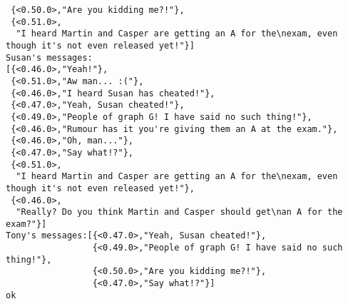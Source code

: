 \begin{verbatim}
 {<0.50.0>,"Are you kidding me?!"},
 {<0.51.0>,
  "I heard Martin and Casper are getting an A for the\nexam, even though it's not even released yet!"}]
Susan's messages:
[{<0.46.0>,"Yeah!"},
 {<0.51.0>,"Aw man... :("},
 {<0.46.0>,"I heard Susan has cheated!"},
 {<0.47.0>,"Yeah, Susan cheated!"},
 {<0.49.0>,"People of graph G! I have said no such thing!"},
 {<0.46.0>,"Rumour has it you're giving them an A at the exam."},
 {<0.46.0>,"Oh, man..."},
 {<0.47.0>,"Say what!?"},
 {<0.51.0>,
  "I heard Martin and Casper are getting an A for the\nexam, even though it's not even released yet!"},
 {<0.46.0>,
  "Really? Do you think Martin and Casper should get\nan A for the exam?"}]
Tony's messages:[{<0.47.0>,"Yeah, Susan cheated!"},
                 {<0.49.0>,"People of graph G! I have said no such thing!"},
                 {<0.50.0>,"Are you kidding me?!"},
                 {<0.47.0>,"Say what!?"}]
ok
\end{verbatim}